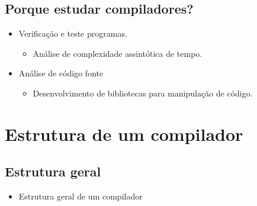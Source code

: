 \documentclass[11pt]{article}
\begin{document}
\subsection*{Porque estudar compiladores?}
\label{sec:orge376a21}

\begin{itemize}
\item Verificação e teste programas.
\begin{itemize}
\item Análise de complexidade assintótica de tempo.
\end{itemize}
\item Análise de código fonte
\begin{itemize}
\item Desenvolvimento de bibliotecas para manipulação de código.
\end{itemize}
\end{itemize}
\section*{Estrutura de um compilador}
\label{sec:orgb31c56c}

\subsection*{Estrutura geral}
\label{sec:org47b0b08}

\begin{itemize}
\item Estrutura geral de um compilador
\end{itemize}
\end{document}
